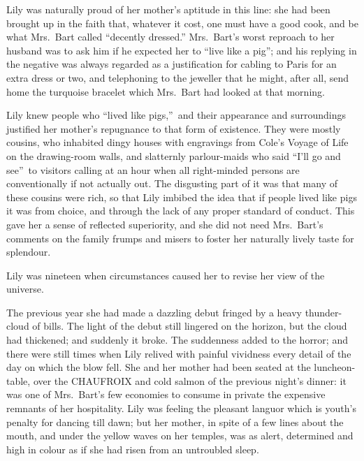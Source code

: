 \documentclass[12pt,a4paper]{book}
\begin{document}
Lily was naturally proud of her mother's aptitude in this line: 
she had been brought up in the faith that, whatever it cost, one
must have a good cook, and be what Mrs.\ Bart called ``decently
dressed.'' Mrs.\ Bart's worst reproach to her husband was to ask
him if he expected her to ``live like a pig''; and his replying in
the negative was always regarded as a justification for cabling
to Paris for an extra dress or two, and telephoning to the
jeweller that he might, after all, send home the turquoise
bracelet which Mrs.\ Bart had looked at that morning.





Lily knew people who ``lived like pigs,''\ and their appearance and
surroundings justified her mother's repugnance to that
form of existence. They were mostly cousins, who inhabited dingy
houses with engravings from Cole's Voyage of Life on the
drawing-room walls, and slatternly parlour-maids who said ``I'll
go and see''\ to visitors calling at an hour when all right-minded
persons are conventionally if not actually out. The disgusting
part of it was that many of these cousins were rich, so that Lily
imbibed the idea that if people lived like pigs it was from
choice, and through the lack of any proper standard of conduct. 
This gave her a sense of reflected superiority, and she did not
need Mrs.\ Bart's comments on the family frumps and misers to
foster her naturally lively taste for splendour.





Lily was nineteen when circumstances caused her to revise her
view of the universe.





The previous year she had made a dazzling debut fringed by a
heavy thunder-cloud of bills. The light of the debut still
lingered on the horizon, but the cloud had thickened; and
suddenly it broke. The suddenness added to the horror; and there
were still times when Lily relived with painful vividness every
detail of the day on which the blow fell. She and her mother had
been seated at the luncheon-table, over the CHAUFROIX and cold
salmon of the previous night's dinner: it was one of Mrs.\ Bart's
few economies to consume in private the expensive remnants of her
hospitality. Lily was feeling the pleasant languor which is
youth's penalty for dancing till dawn; but her mother, in spite
of a few lines about the mouth, and under the yellow waves on her
temples, was as alert, determined and high in colour as if she
had risen from an untroubled sleep.
\end{document}
